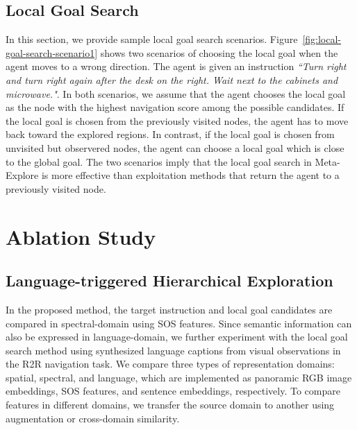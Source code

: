 \documentclass[10pt,twocolumn,letterpaper]{article}
\begin{document}
\subsection{Local Goal Search}
In this section, we provide sample local goal search scenarios. Figure~\ref{fig:local-goal-search-scenario1} shows two scenarios of choosing the local goal when the agent moves to a wrong direction. The agent is given an instruction \textit{``Turn right and turn right again after the desk on the right. Wait next to the cabinets and microwave."}. In both scenarios, we assume that the agent chooses the local goal as the node with the highest navigation score among the possible candidates. If the local goal is chosen from the previously visited nodes, the agent has to move back toward the explored regions. In contrast, if the local goal is chosen from unvisited but observered nodes, the agent can choose a local goal which is close to the global goal. The two scenarios imply that the local goal search in Meta-Explore is more effective than exploitation methods that return the agent to a previously visited node.


\section{Ablation Study}\label{sec:ablation-study}
\subsection{Language-triggered Hierarchical Exploration}

In the proposed method, the target instruction and local goal candidates are compared in spectral-domain using SOS features. Since semantic information can also be expressed in language-domain, we further experiment with the local goal search method using synthesized language captions from visual observations in the R2R navigation task. We compare three types of representation domains: spatial, spectral, and language, which are implemented as panoramic RGB image embeddings, SOS features, and sentence embeddings, respectively. To compare features in different domains, we transfer the source domain to another using augmentation or cross-domain similarity.
\end{document}
